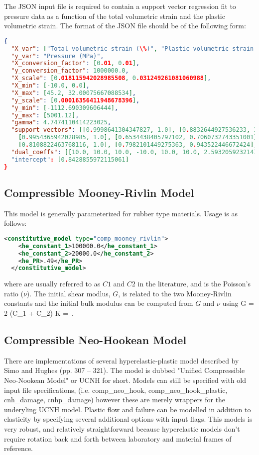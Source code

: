 The JSON input file is required to contain a support vector regression fit to pressure data
as a function of the total volumetric strain and the plastic volumetric strain.  The format 
of the JSON file should be of the following form:
\begin{lstlisting}[language=JSON]
{
  "X_var": ["Total volumetric strain (\%)", "Plastic volumetric strain (\%)"],
  "y_var": "Pressure (MPa)",
  "X_conversion_factor": [0.01, 0.01],
  "y_conversion_factor": 1000000.0,
  "X_scale": [0.018115942028985508, 0.031249261081060988],
  "X_min": [-10.0, 0.0],
  "X_max": [45.2, 32.00075667088534],
  "y_scale": [0.00016356411948678396],
  "y_min": [-1112.690309606444],
  "y_max": [5001.12],
  "gamma": 4.7474110414223025,
  "support_vectors": [[0.9998641304347827, 1.0], [0.8832644927536233, 1.0],
    [0.9954365942028985, 1.0], [0.6534438405797102, 0.7060732743351001],
    [0.8108822463768116, 1.0], [0.7982101449275363, 0.943522446672424], ...],
  "dual_coeffs": [[10.0, 10.0, 10.0, -10.0, 10.0, 10.0, 2.5932059232147773, 10.0, ...],
  "intercept": [0.8428855972115061]
}
\end{lstlisting}

\subsection{Compressible Mooney-Rivlin Model} This model is generally parameterized
for rubber type materials.  Usage is as follows:
\begin{lstlisting}[language=XML]
  <constitutive_model type="comp_mooney_rivlin">
    <he_constant_1>100000.0</he_constant_1>
    <he_constant_2>20000.0</he_constant_2>
    <he_PR>.49</he_PR>
  </constitutive_model>
\end{lstlisting}
where  are usually referred to
as $C1$ and $C2$ in the literature, and  is the Poisson's ratio ($\nu$).
The initial shear modlus, $G$, is related to the two Mooney-Rivlin constants and the 
initial bulk modulus can be computed from $G$ and $\nu$ using
\Beq
  G = 2 (C_1 + C_2) \quad \Tand \quad K =  \,.
\Eeq

\subsection{Compressible Neo-Hookean Model} There are implementations of several
hyperelastic-plastic model described by Simo and Hughes\cite{Simo1998} (pp. 307 -- 321). 
 The model is dubbed "Unified Compressible Neo-Nookean Model" or UCNH for short.  Models can 
still be specified with old input file specifications, (i.e. comp\_neo\_hook, comp\_neo\_hook\_plastic,
cnh\_damage, cnhp\_damage) however these are merely wrappers for the underyling UCNH model.
 Plastic flow and failure can be modelled in addition to elasticity by  specifying 
several additional options with input flags. This models is very robust, and relatively 
straightforward because hyperelastic models don't require rotation back and forth 
between laboratory and material frames of reference.


